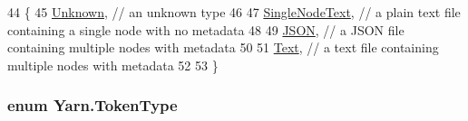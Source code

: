 \begin{DoxyCode}
44     \{
45         \hyperlink{a00053_ad7ebb46e7309ead8767383a672b3272fa88183b946cc5f0e8c96b2e66e1c74a7e}{Unknown}, \textcolor{comment}{// an unknown type}
46 
47         \hyperlink{a00053_ad7ebb46e7309ead8767383a672b3272faceeb33da53902872b63956f8df786cd8}{SingleNodeText}, \textcolor{comment}{// a plain text file containing a single node with no metadata}
48 
49         \hyperlink{a00053_ad7ebb46e7309ead8767383a672b3272fa0ecd11c1d7a287401d148a23bbd7a2f8}{JSON}, \textcolor{comment}{// a JSON file containing multiple nodes with metadata}
50 
51         \hyperlink{a00053_a301aa7c866593a5b625a8fc158bbeacea9dffbf69ffba8bc38bc4e01abf4b1675}{Text}, \textcolor{comment}{//  a text file containing multiple nodes with metadata}
52 
53     \}
\end{DoxyCode}
\hypertarget{a00053_a301aa7c866593a5b625a8fc158bbeace}{
\subsubsection[{Token\-Type}]{\setlength{\rightskip}{0pt plus 5cm}enum {\bf Yarn.\-Token\-Type}\hspace{0.3cm}{\ttfamily [package]}}}\label{a00053_a301aa7c866593a5b625a8fc158bbeace}
